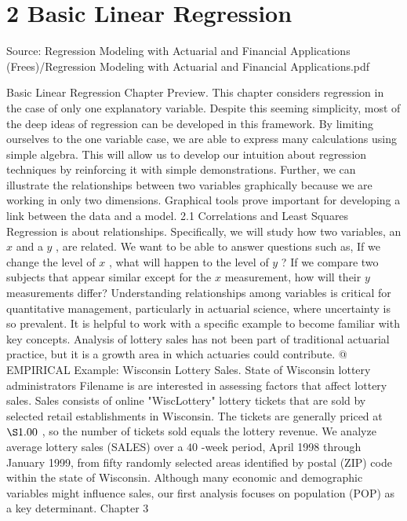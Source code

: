 \documentclass[11pt]{article}
\begin{document}
\section*{2 Basic Linear Regression}
{\small Source: Regression Modeling with Actuarial and Financial Applications (Frees)/Regression Modeling with Actuarial and Financial Applications.pdf\par}
Basic Linear Regression
Chapter Preview. This chapter considers regression in the case of only one explanatory
variable. Despite this seeming simplicity, most of the deep ideas of regression can be
developed in this framework. By limiting ourselves to the one variable case, we are
 able to express many calculations using simple algebra. This will allow us to develop
our intuition about regression techniques by reinforcing it with simple demonstrations.
 Further, we can illustrate the relationships between two variables graphically because we
are working in only two dimensions. Graphical tools prove important for developing a
link between the data and a model.
 2.1 Correlations and Least Squares
Regression is about relationships. Specifically, we will study how two variables,
an \(x\) and a \(y\) , are related. We want to be able to answer questions such as, If
 we change the level of \(x\) , what will happen to the level of \(y\) ? If we compare
two subjects that appear similar except for the \(x\) measurement, how will their \(y\)
 measurements differ? Understanding relationships among variables is critical for
quantitative management, particularly in actuarial science, where uncertainty is
 so prevalent.
It is helpful to work with a specific example to become familiar with key
 concepts. Analysis of lottery sales has not been part of traditional actuarial
 practice, but it is a growth area in which actuaries could contribute.
@ EMPIRICAL
Example: Wisconsin Lottery Sales. State of Wisconsin lottery administrators Filename is
 are interested in assessing factors that affect lottery sales. Sales consists of online "WiscLottery"
lottery tickets that are sold by selected retail establishments in Wisconsin. The
tickets are generally priced at \(\S1 . 0 0\) , so the number of tickets sold equals the
 lottery revenue. We analyze average lottery sales (SALES) over a \(4 0\) -week period,
April 1998 through January 1999, from fifty randomly selected areas identified
by postal (ZIP) code within the state of Wisconsin.
Although many economic and demographic variables might influence sales,
 our first analysis focuses on population (POP) as a key determinant. Chapter 3
\end{document}

